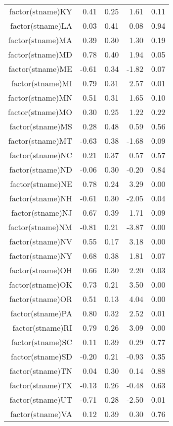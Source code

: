 \begin{table}[ht]
\begin{tabular}{rrrrr}
  factor(stname)KY & 0.41 & 0.25 & 1.61 & 0.11 \\ 
  factor(stname)LA & 0.03 & 0.41 & 0.08 & 0.94 \\ 
  factor(stname)MA & 0.39 & 0.30 & 1.30 & 0.19 \\ 
  factor(stname)MD & 0.78 & 0.40 & 1.94 & 0.05 \\ 
  factor(stname)ME & -0.61 & 0.34 & -1.82 & 0.07 \\ 
  factor(stname)MI & 0.79 & 0.31 & 2.57 & 0.01 \\ 
  factor(stname)MN & 0.51 & 0.31 & 1.65 & 0.10 \\ 
  factor(stname)MO & 0.30 & 0.25 & 1.22 & 0.22 \\ 
  factor(stname)MS & 0.28 & 0.48 & 0.59 & 0.56 \\ 
  factor(stname)MT & -0.63 & 0.38 & -1.68 & 0.09 \\ 
  factor(stname)NC & 0.21 & 0.37 & 0.57 & 0.57 \\ 
  factor(stname)ND & -0.06 & 0.30 & -0.20 & 0.84 \\ 
  factor(stname)NE & 0.78 & 0.24 & 3.29 & 0.00 \\ 
  factor(stname)NH & -0.61 & 0.30 & -2.05 & 0.04 \\ 
  factor(stname)NJ & 0.67 & 0.39 & 1.71 & 0.09 \\ 
  factor(stname)NM & -0.81 & 0.21 & -3.87 & 0.00 \\ 
  factor(stname)NV & 0.55 & 0.17 & 3.18 & 0.00 \\ 
  factor(stname)NY & 0.68 & 0.38 & 1.81 & 0.07 \\ 
  factor(stname)OH & 0.66 & 0.30 & 2.20 & 0.03 \\ 
  factor(stname)OK & 0.73 & 0.21 & 3.50 & 0.00 \\ 
  factor(stname)OR & 0.51 & 0.13 & 4.04 & 0.00 \\ 
  factor(stname)PA & 0.80 & 0.32 & 2.52 & 0.01 \\ 
  factor(stname)RI & 0.79 & 0.26 & 3.09 & 0.00 \\ 
  factor(stname)SC & 0.11 & 0.39 & 0.29 & 0.77 \\ 
  factor(stname)SD & -0.20 & 0.21 & -0.93 & 0.35 \\ 
  factor(stname)TN & 0.04 & 0.30 & 0.14 & 0.88 \\ 
  factor(stname)TX & -0.13 & 0.26 & -0.48 & 0.63 \\ 
  factor(stname)UT & -0.71 & 0.28 & -2.50 & 0.01 \\ 
  factor(stname)VA & 0.12 & 0.39 & 0.30 & 0.76 \\ 

\end{tabular}
\end{table}
